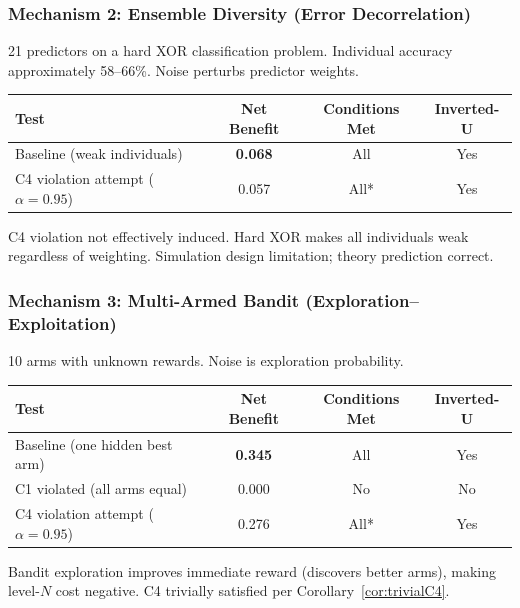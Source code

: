 \documentclass[12pt,letterpaper]{article}
\theoremstyle{definition}
\theoremstyle{remark}
\begin{document}
\subsubsection{Mechanism 2: Ensemble Diversity (Error Decorrelation)}

21 predictors on a hard XOR classification problem. Individual accuracy approximately 58--66\%. Noise perturbs predictor weights.

\begin{center}
\begin{tabular}{@{}lccc@{}}
\toprule
\textbf{Test} & \textbf{Net Benefit} & \textbf{Conditions Met} & \textbf{Inverted-U} \\
\midrule
Baseline (weak individuals) & \textbf{0.068} & All & Yes \\
C4 violation attempt ($\alpha = 0.95$) & 0.057 & All* & Yes \\
\bottomrule
\end{tabular}
\end{center}

\noindent *C4 violation not effectively induced. Hard XOR makes all individuals weak regardless of weighting. Simulation design limitation; theory prediction correct.

\subsubsection{Mechanism 3: Multi-Armed Bandit (Exploration--Exploitation)}

10 arms with unknown rewards. Noise is exploration probability.

\begin{center}
\begin{tabular}{@{}lccc@{}}
\toprule
\textbf{Test} & \textbf{Net Benefit} & \textbf{Conditions Met} & \textbf{Inverted-U} \\
\midrule
Baseline (one hidden best arm) & \textbf{0.345} & All & Yes \\
C1 violated (all arms equal) & 0.000 & No & No \\
C4 violation attempt ($\alpha = 0.95$) & 0.276 & All* & Yes \\
\bottomrule
\end{tabular}
\end{center}

\noindent *Bandit exploration improves immediate reward (discovers better arms), making level-$N$ cost negative. C4 trivially satisfied per Corollary~\ref{cor:trivialC4}.
\end{document}
